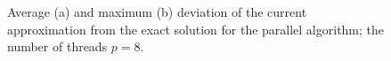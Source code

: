 \documentclass[smallcondensed]{svjour3}     %
\begin{document}
\begin{figure}
\begin{minipage}{0.5\linewidth}
\end{minipage}
\hfill
\begin{minipage}{0.5\linewidth}
\end{minipage}
\caption{Average (a) and maximum (b) deviation of the current approximation from the exact solution for the parallel algorithm; the number of threads $p = 8$.}
\label{fig_last3}
\end{figure}
\end{document}
